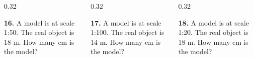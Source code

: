 \documentclass[aspectratio=169,12pt]{beamer}
\newcommand{\MMProblem}[2]{\begin{MMProblemCard}\raggedright\small\textbf{#1.} #2\par\end{MMProblemCard}}
\begin{document}
\begin{frame}[t]
\begin{center}
\end{center}
\vspace{0.05em}
\begin{columns}[T,onlytextwidth]
\begin{column}{0.32\textwidth}\MMProblem{16}{A model is at scale 1:50. The real object is 18 m. How many cm is the model?}\end{column}
\begin{column}{0.32\textwidth}\MMProblem{17}{A model is at scale 1:100. The real object is 14 m. How many cm is the model?}\end{column}
\begin{column}{0.32\textwidth}\MMProblem{18}{A model is at scale 1:20. The real object is 18 m. How many cm is the model?}\end{column}
\end{columns}
\end{frame}
\end{document}
